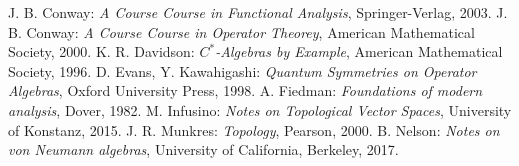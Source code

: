 \begin{thebibliography}{99}
	 J. B. Conway: \emph{A Course Course in Functional Analysis}, Springer-Verlag, 2003.
	 J. B. Conway: \emph{A Course Course in Operator Theorey}, American Mathematical Society, 2000.
	 K. R. Davidson: \emph{$C^{*}$-Algebras by Example}, American Mathematical Society, 1996.
	 D. Evans, Y. Kawahigashi: \emph{Quantum Symmetries on Operator Algebras}, Oxford University Press, 1998.
	 A. Fiedman: \emph{Foundations of modern analysis}, Dover, 1982.
	 M. Infusino: \emph{Notes on Topological Vector Spaces}, University of Konstanz, 2015.
	 J. R. Munkres: \emph{Topology}, Pearson, 2000.
	 B. Nelson: \emph{Notes on von Neumann algebras}, University of California, Berkeley, 2017.
\end{thebibliography}